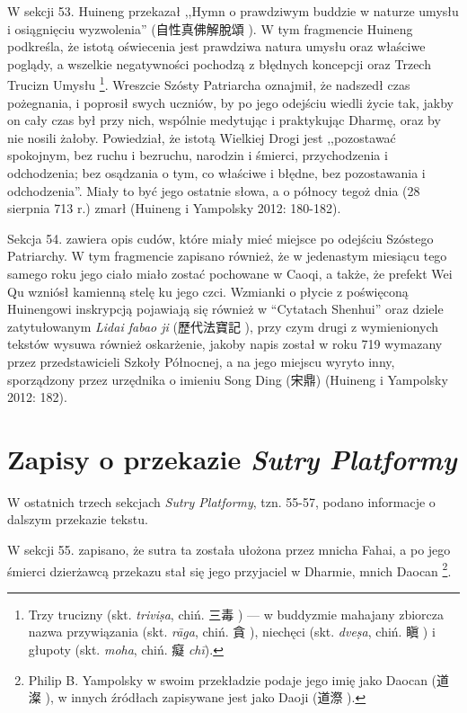W sekcji 53. Huineng przekazał ,,Hymn o prawdziwym buddzie w naturze umysłu i osiągnięciu wyzwolenia'' (自性真佛解脫頌 ).
W tym fragmencie Huineng podkreśla, że istotą oświecenia jest prawdziwa natura umysłu oraz właściwe poglądy, a wszelkie negatywności pochodzą z błędnych koncepcji oraz Trzech Trucizn Umysłu%
\footnote{Trzy trucizny\label{SanDu} (skt. \textit{trivi\d{s}a}, chiń. 三毒 ) --- w buddyzmie mahajany zbiorcza nazwa przywiązania (skt. \textit{rāga}, chiń. 貪 ), niechęci (skt. \textit{dve\d{s}a}, chiń. 瞋 ) i głupoty (skt. \textit{moha}, chiń. 癡 \textit{chī}).}.
Wreszcie Szósty Patriarcha oznajmił, że nadszedł czas pożegnania, i poprosił swych uczniów, by po jego odejściu wiedli życie tak, jakby on cały czas był przy nich, wspólnie medytując i praktykując Dharmę, oraz by nie nosili żałoby.
Powiedział, że istotą Wielkiej Drogi jest ,,pozostawać spokojnym, bez ruchu i bezruchu, narodzin i śmierci, przychodzenia i odchodzenia; bez osądzania o tym, co właściwe i błędne, bez pozostawania i odchodzenia''.
Miały to być jego ostatnie słowa, a o północy tegoż dnia (28 sierpnia 713 r.) zmarł
(Huineng i Yampolsky 2012: 180-182).

Sekcja 54. zawiera opis cudów, które miały mieć miejsce po odejściu Szóstego Patriarchy.
W tym fragmencie zapisano również, że w jedenastym miesiącu tego samego roku jego ciało miało zostać pochowane w Caoqi, a także, że prefekt Wei Qu wzniósł kamienną stelę ku jego czci.
Wzmianki o płycie z poświęconą Huinengowi inskrypcją pojawiają się również w ``Cytatach Shenhui'' oraz dziele zatytułowanym \textit{Lidai fabao ji} (歷代法寶記 ), przy czym drugi z wymienionych tekstów wysuwa również oskarżenie, jakoby napis został w roku 719 wymazany przez przedstawicieli Szkoły Północnej, a na jego miejscu wyryto inny, sporządzony przez urzędnika o imieniu Song Ding (宋鼎)
(Huineng i Yampolsky 2012: 182).

\section{Zapisy o przekazie \textit{Sutry Platformy}}
W ostatnich trzech sekcjach \textit{Sutry Platformy}, tzn. 55-57, podano informacje o dalszym przekazie tekstu.

W sekcji 55. zapisano, że sutra ta została ułożona przez mnicha Fahai, a po jego śmierci dzierżawcą przekazu stał się jego przyjaciel w Dharmie, mnich Daocan%
\footnote{Philip B. Yampolsky w swoim przekładzie podaje jego imię jako Daocan (道澯 ), w innych źródłach zapisywane jest jako Daoji (道漈 ).}.

